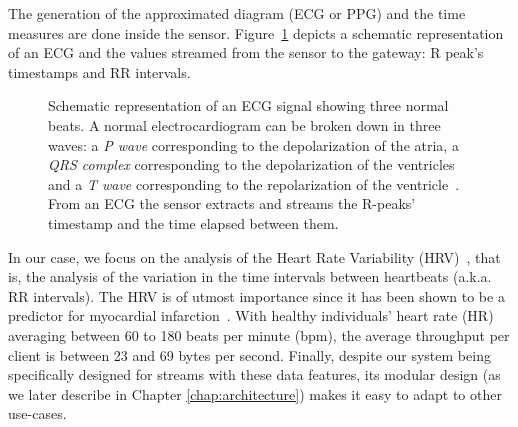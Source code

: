 The generation of the approximated diagram (ECG or PPG) and the time measures are done inside the sensor.
Figure~\ref{fig:ecg-hrv} depicts a schematic representation of an ECG and the values streamed from the sensor to the gateway: R peak's timestamps and RR intervals. 
\begin{figure}[h!]
    \centering
    
    \caption[Schematic representation of an ECG signal showing three normal beats.]{Schematic representation of an ECG signal showing three normal beats. A normal electrocardiogram can be broken down in three waves: a \textit{P wave} corresponding to the depolarization of the atria, a \textit{QRS complex} corresponding to the depolarization of the ventricles and a \textit{T wave} corresponding to the repolarization of the ventricle~\cite{Lilly2001}. From an ECG the sensor extracts and streams the R-peaks' timestamp and the time elapsed between them. \label{fig:ecg-hrv}}
\end{figure}

In our case, we focus on the analysis of the Heart Rate Variability (HRV)~\cite{Camm1996}, that is, the analysis of the variation in the time intervals between heartbeats (a.k.a. RR intervals).
The HRV is of utmost importance since it has been shown to be a predictor for myocardial infarction~\cite{Kleiger1987,Bigger1992}.
With healthy individuals' heart rate (HR) averaging between 60 to 180 beats per minute (bpm), the average throughput per client is between 23 and 69 bytes per second.
Finally, despite our system being specifically designed for streams with these data features, its modular design (as we later describe in Chapter \ref{chap:architecture}) makes it easy to adapt to other use-cases.
